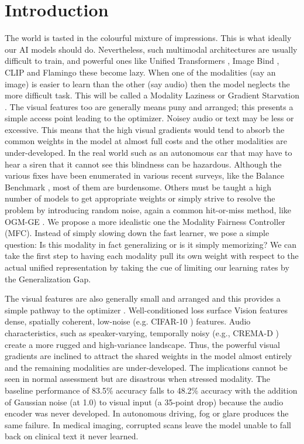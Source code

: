 \documentclass[10pt, twocolumn, letterpaper]{article}
\begin{document}
\section{Introduction}
The world is tasted in the colourful mixture of impressions. This is what ideally our AI models should do. Nevertheless, such multimodal architectures are usually difficult to train, and powerful ones like Unified Transformers \cite{zhang2023meta}, Image Bind \cite{girdhar2023imagebind}, CLIP \cite{radford2021learning} and Flamingo \cite{alayrac2022flamingo} these become lazy. When one of the modalities (say an image) is easier to learn than the other (say audio) then the model neglects the more difficult task. This will be called a Modality Laziness or Gradient Starvation \cite{pezeshki2021gradient}. The visual features too are generally means puny and arranged; this presents a simple access point leading to the optimizer. Noisey audio or text may be less or excessive. This means that the high visual gradients would tend to absorb the common weights in the model at almost full costs and the other modalities are under-developed. In the real world such as an autonomous car that may have to hear a siren that it cannot see this blindness can be hazardous. Although the various fixes have been enumerated in various recent surveys, like the Balance Benchmark \cite{xu2025balancebenchmark}, most of them are burdensome. Others must be taught a high number of models to get appropriate weights or simply strive to resolve the problem by introducing random noise, again a common hit-or-miss method, like OGM-GE \cite{peng2022balanced}. We propose a more idealistic one the Modality Fairness Controller (MFC). Instead of simply slowing down the fast learner, we pose a simple question: Is this modality in fact generalizing or is it simply memorizing? We can take the first step to having each modality pull its own weight with respect to the actual unified representation by taking the cue of limiting our learning rates by the Generalization Gap.

The visual features are also generally small and arranged and this provides a simple pathway to the optimizer \cite{pezeshki2021gradient}. Well-conditioned loss surface Vision features dense, spatially coherent, low-noise (e.g. CIFAR-10 \cite{krizhevsky2009learning}) features. Audio characteristics, such as speaker-varying, temporally noisy (e.g., CREMA-D \cite{cao2014crema}) create a more rugged and high-variance landscape. Thus, the powerful visual gradients are inclined to attract the shared weights in the model almost entirely and the remaining modalities are under-developed. The implications cannot be seen in normal assessment but are disastrous when stressed modality. The baseline performance of 83.5\% accuracy falls to 48.2\% accuracy with the addition of Gaussian noise (at 1.0) to visual input (a 35-point drop) because the audio encoder was never developed. In autonomous driving, fog or glare produces the same failure. In medical imaging, corrupted scans leave the model unable to fall back on clinical text it never learned.
\end{document}
